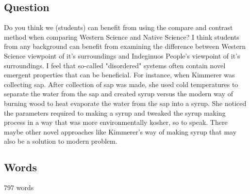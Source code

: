 \documentclass[a4paper,man,biblatex]{apa6}
\begin{document}
\subsection{Question} Do you think we (students) can benefit from using the compare and contrast method when comparing Western Science and Native Science? I think students from any background can benefit from examining the difference between Western Science viewpoint of it's surroundings and Indeginuos People's viewpoint of it's surroundings. I feel that so-called "disordered" systems often contain novel emergent properties that can be beneficial. For instance, when Kimmerer was collecting sap. After collection of sap was made, she used cold temperatures to separate the water from the sap and created syrup versus the modern way of burning wood to heat evaporate the water from the sap into a syrup. She noticed the parameters required to making a syrup and tweaked the syrup making process in a way that was more environmentally kosher, so to speak. There maybe other novel approaches like Kimmerer's way of making syrup that may also be a solution to modern problem.  

\subsection{Words} 797 words

\printbibliography
\end{document}
